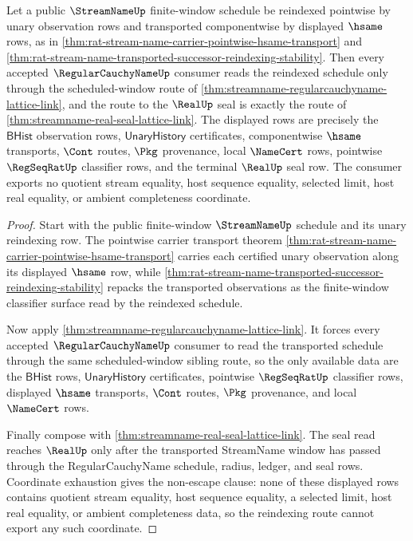 \begin{theorem}
\label{thm:streamname-regularcauchyname-pointwise-reindexing-route}
Let a public $\StreamNameUp$ finite-window schedule be reindexed pointwise by unary observation rows and transported componentwise by displayed $\hsame$ rows, as in \autoref{thm:rat-stream-name-carrier-pointwise-hsame-transport} and \autoref{thm:rat-stream-name-transported-successor-reindexing-stability}. Then every accepted $\RegularCauchyNameUp$ consumer reads the reindexed schedule only through the scheduled-window route of \autoref{thm:streamname-regularcauchyname-lattice-link}, and the route to the $\RealUp$ seal is exactly the route of \autoref{thm:streamname-real-seal-lattice-link}. The displayed rows are precisely the $\mathsf{BHist}$ observation rows, $\mathsf{UnaryHistory}$ certificates, componentwise $\hsame$ transports, $\Cont$ routes, $\Pkg$ provenance, local $\NameCert$ rows, pointwise $\RegSeqRatUp$ classifier rows, and the terminal $\RealUp$ seal row. The consumer exports no quotient stream equality, host sequence equality, selected limit, host real equality, or ambient completeness coordinate.
\end{theorem}
\begin{proof}
Start with the public finite-window $\StreamNameUp$ schedule and its unary reindexing row. The pointwise carrier transport theorem \autoref{thm:rat-stream-name-carrier-pointwise-hsame-transport} carries each certified unary observation along its displayed $\hsame$ row, while \autoref{thm:rat-stream-name-transported-successor-reindexing-stability} repacks the transported observations as the finite-window classifier surface read by the reindexed schedule.

Now apply \autoref{thm:streamname-regularcauchyname-lattice-link}. It forces every accepted $\RegularCauchyNameUp$ consumer to read the transported schedule through the same scheduled-window sibling route, so the only available data are the $\mathsf{BHist}$ rows, $\mathsf{UnaryHistory}$ certificates, pointwise $\RegSeqRatUp$ classifier rows, displayed $\hsame$ transports, $\Cont$ routes, $\Pkg$ provenance, and local $\NameCert$ rows.

Finally compose with \autoref{thm:streamname-real-seal-lattice-link}. The seal read reaches $\RealUp$ only after the transported StreamName window has passed through the RegularCauchyName schedule, radius, ledger, and seal rows. Coordinate exhaustion gives the non-escape clause: none of these displayed rows contains quotient stream equality, host sequence equality, a selected limit, host real equality, or ambient completeness data, so the reindexing route cannot export any such coordinate.
\end{proof}
